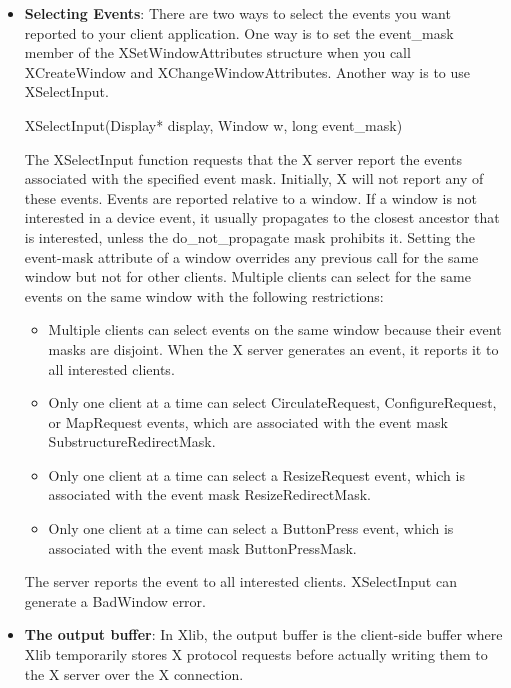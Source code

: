 \documentclass{report}
\begin{document}
    \pagebreak 
    \begin{itemize}
        \item \textbf{Selecting Events}:  There are two ways to select the events you want reported to your client application. One way is to set the event\_mask member of the XSetWindowAttributes structure when you call XCreateWindow and XChangeWindowAttributes. Another way is to use XSelectInput.
            \bigbreak \noindent 
            \begin{cppcode}
                XSelectInput(Display* display, Window w, long event_mask)
            \end{cppcode}
            \bigbreak \noindent 
            The XSelectInput function requests that the X server report the events associated with the specified event mask. Initially, X will not report any of these events. Events are reported relative to a window. If a window is not interested in a device event, it usually propagates to the closest ancestor that is interested, unless the do\_not\_propagate mask prohibits it. Setting the event-mask attribute of a window overrides any previous call for the same window but not for other clients. Multiple clients can select for the same events on the same window with the following restrictions:
            \begin{itemize}
                \item Multiple clients can select events on the same window because their event masks are disjoint. When the X server generates an event, it reports it to all interested clients.
                \item Only one client at a time can select CirculateRequest, ConﬁgureRequest, or MapRequest events, which are associated with the event mask SubstructureRedirectMask.
                \item Only one client at a time can select a ResizeRequest event, which is associated with the event mask ResizeRedirectMask.
                \item Only one client at a time can select a ButtonPress event, which is associated with the event mask ButtonPressMask.
            \end{itemize}
            The server reports the event to all interested clients.
            \bigbreak \noindent 
            XSelectInput can generate a BadWindow error.
        \item \textbf{The output buffer}: In Xlib, the output buffer is the client-side buffer where Xlib temporarily stores X protocol requests before actually writing them to the X server over the X connection.

\end{itemize}
\end{document}
